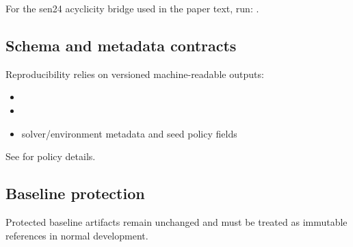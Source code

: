 For the sen24 acyclicity bridge used in the paper text, run:
.

\subsection{Schema and metadata contracts}
Reproducibility relies on versioned machine-readable outputs:
\begin{itemize}[leftmargin=*]
  \item {}
  \item {}
  \item solver/environment metadata and seed policy fields
\end{itemize}

See  for policy details.

\subsection{Baseline protection}
Protected baseline artifacts remain unchanged and must be treated as immutable references in normal development.
